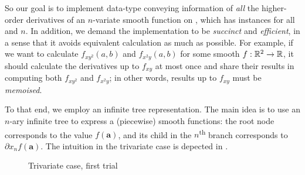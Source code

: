 \documentclass[./rims-smooth-paper.tex]{subfiles}
\begin{document}
So our goal is to implement  data-type conveying information of \emph{all} the higher-order derivatives of an $n$-variate smooth function on , which has  instances for all  and $n$.
In addition, we demand the implementation to be \emph{succinct} and \emph{efficient}, in a sense that it avoids equivalent calculation as much as possible.
For example, if we want to calculate $f_{xy^2}(a,b)$ and $f_{x^2y}(a,b)$ for some smooth $f: \mathbb{R}^2 \to \mathbb{R}$, it should calculate the derivatives up to $f_{xy}$ at most once and share their results in computing both $f_{xy^2}$ and $f_{x^2y}$; in other words, results up to $f_{xy}$ must be \emph{memoised}.

To that end, we employ an infinite tree representation.
The main idea is to use an $n$-ary infinite tree to express a (piecewise) smooth functions: the root node corresponds to the value $f(\boldsymbol{a})$, and its child in the $n$\textsuperscript{th} branch corresponds to $\partial x_n f(\boldsymbol{a})$.
The intuition in the trivariate case is depected in .
\begin{figure}[tbp]
  \centering
  \caption{Trivariate case, first trial\label{fig:tree-simpl}}
\end{figure}
\end{document}
